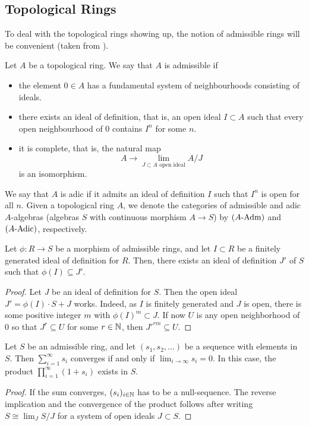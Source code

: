 \documentclass[../main.tex]{subfiles}
\begin{document}
\subsection{Topological Rings}
To deal with the topological rings showing up, the notion of admissible rings
will be convenient (taken from \cite[Tag 07E8]{stacks-project}).
\begin{defi}\label{def:admring}
  Let $A$ be a topological ring. We say that $A$ is admissible if
  \begin{itemize}
    \item the element $0 \in A$ has a fundamental system of neighbourhoods
      consisting of ideals.
    \item there exists an ideal of definition, that is, an open ideal $I
      \subset A$ such that every open neighbourhood of $0$ contains $I^n$ for
      some $n$.
    \item it is complete, that is, the natural map
      \begin{equation*}
        A \to \lim_{J \subset A \text{ open ideal}} A/J
      \end{equation*}
      is an isomorphism.
  \end{itemize}
  We say that $A$ is adic if it admits an ideal of definition $I$ such that 
  $I^n$ is open for all $n$.
  Given a topological ring $A$, we denote the categories of admissible 
  and adic $A$-algebras (algebras $S$ with continuous morphism $A \to S$) by
  ${({A}\textnormal-\allowbreak\mathrm{Adm})}$ and ${({A}\textnormal-\allowbreak\mathrm{Adic})}$, respectively.
\end{defi}

\begin{lem} \label{lem:iodimage}
  Let $\phi\colon R \to S$ be a morphism of admissible rings, and let $I \subset R$
  be a finitely generated ideal of definition for $R$. Then, there exists an
  ideal of definition $J'$ of $S$ such that $\phi(I) \subseteq J'$.
\begin{proof}
  Let $J$ be an ideal of definition for $S$. Then the open
  ideal $J' = \phi(I)\cdot S + J$ works. Indeed, as $I$
  is finitely generated and $J$ is open, there is some positive integer $m$ with $\phi(I)^m \subset J$. If now $U$ is any open neighborhood 
  of $0$ so that $J^r \subseteq U$ for some $r \in \mathbb{N}$, then $J'^{rm} \subseteq U$. 
\end{proof}
\end{lem}

\begin{lem}\label{lem:infiniteseriesandproducts}
  Let $S$ be an admissible ring, and let $(s_1, s_2, \dots)$ be a sequence with
  elements in $S$. Then $\sum_{i = 1}^\infty s_i$ converges if and only if 
   $\lim_{i \to \infty} s_i = 0$. In this case, the product $\prod_{i=1}^\infty (1 + s_i)$
   exists in $S$.
\begin{proof}
  If the sum converges, $(s_i)_{i \in \mathbb{N}}$ has to be a null-sequence. The
  reverse implication and the convergence of the product follows after writing
  $S \cong \lim_{J} S/J$ for a system of open ideals $J \subset S$. 
\end{proof}
\end{lem}
\end{document}
